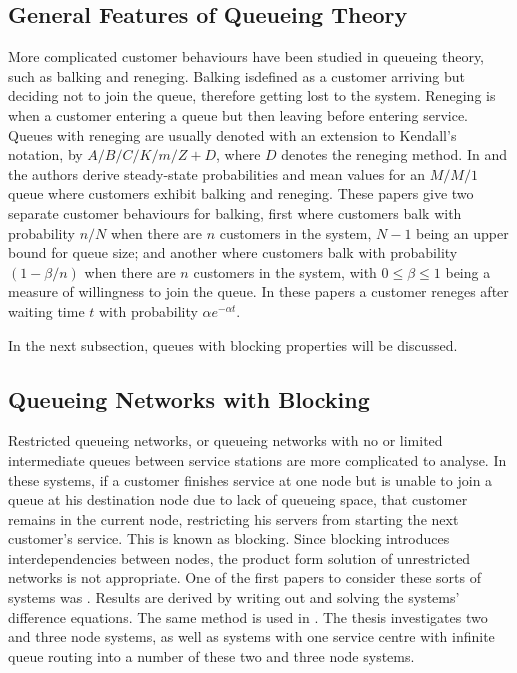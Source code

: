 \documentclass{article}
\begin{document}
\subsection{General Features of Queueing Theory}

More complicated customer behaviours have been studied in queueing theory, such
as balking and reneging.
Balking isdefined as a customer arriving but deciding not to join the queue,
therefore getting lost to the system.
Reneging is when a customer entering a queue but then leaving before entering service.
Queues with reneging are usually denoted with an extension to Kendall's notation, by $A/B/C/K/m/Z + D$, where $D$ denotes the reneging method.
In \cite{anckerjrgafarian63a} and \cite{anckerjrgafarian63b} the authors derive steady-state probabilities and mean values for an $M/M/1$ queue where customers exhibit balking and reneging.
These papers give two separate customer behaviours for balking, first where customers balk with probability $n/N$ when there are $n$ customers in the system, $N-1$ being an upper bound for queue size; and another where customers balk with probability $(1-\beta/n)$ when there are $n$ customers in the system, with $0\leq\beta\leq1$ being a measure of willingness to join the queue.
In these papers a customer reneges after waiting time $t$ with probability $\alpha e^{-\alpha t}$.

In the next subsection, queues with blocking properties will be discussed.

\subsection{Queueing Networks with Blocking}

Restricted queueing networks, or queueing networks with no or limited intermediate queues between service stations are more complicated to analyse.
In these systems, if a customer finishes service at one node but is unable to join a queue at his destination node due to lack of queueing space, that customer remains in the current node, restricting his servers from starting the next customer's service.
This is known as blocking.
Since blocking introduces interdependencies between nodes, the product form
solution of unrestricted networks is not appropriate.
One of the first papers to consider these sorts of systems was \cite{hunt56}.
Results are derived by writing out and solving the systems' difference equations.
The same method is used in \cite{baber08}.
The thesis investigates two and three node systems, as well as systems with one
service centre with infinite queue routing into a number of these two and three node systems.
\end{document}
